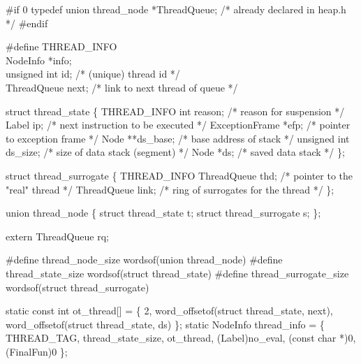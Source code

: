 
\nwenddocs{}\plusendmoddef\nwstartdeflinemarkup{}\nwenddeflinemarkup
#if 0
typedef union thread_node *ThreadQueue; /* already declared in heap.h */
#endif

#define THREAD_INFO \\
    NodeInfo         *info; \\
    unsigned int     id;                /* (unique) thread id */ \\
    ThreadQueue      next;              /* link to next thread of queue */

struct thread_state \{
    THREAD_INFO
    int              reason;            /* reason for suspension */
    Label            ip;                /* next instruction to be executed */
    ExceptionFrame   *efp;              /* pointer to exception frame */
    Node             **ds_base;         /* base address of stack */
    unsigned int     ds_size;           /* size of data stack (segment) */
    Node             *ds;               /* saved data stack */
\};

struct thread_surrogate \{
    THREAD_INFO
    ThreadQueue      thd;               /* pointer to the "real" thread */
    ThreadQueue      link;              /* ring of surrogates for the thread */
\};

union thread_node \{
    struct thread_state     t;
    struct thread_surrogate s;
\};

extern ThreadQueue rq;

\nwendcode{}\nwdocspar
\nwenddocs{}\plusendmoddef\nwstartdeflinemarkup{}\nwenddeflinemarkup
#define thread_node_size        wordsof(union thread_node)
#define thread_state_size       wordsof(struct thread_state)
#define thread_surrogate_size   wordsof(struct thread_surrogate)

static const int ot_thread[] = \{
    2,
    word_offsetof(struct thread_state, next),
    word_offsetof(struct thread_state, ds)
\};
static NodeInfo thread_info = \{
    THREAD_TAG, thread_state_size, ot_thread, (Label)no_eval, (const char *)0,
    (FinalFun)0
\};

